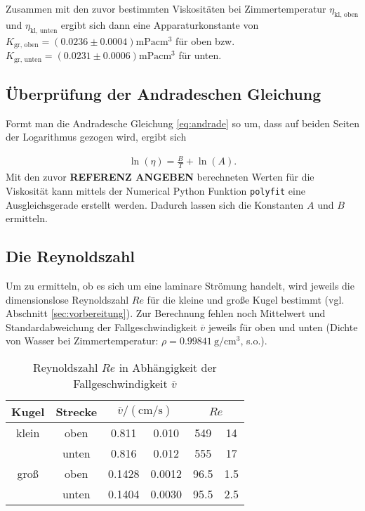 Zusammen mit den zuvor bestimmten Viskositäten bei Zimmertemperatur $\eta_{\text{kl, oben}}$ und $\eta_{\text{kl, unten}}$ ergibt sich dann eine Apparaturkonstante von
$K_{\text{gr, oben}} = \left(0.0236 \pm 0.0004 \right) \unit{\milli\Pa \cubic\cm}$ für oben bzw.
$K_{\text{gr, unten}} = \left(0.0231 \pm 0.0006 \right) \unit{\milli\Pa \cubic\cm}$ für unten.




\subsection[]{Überprüfung der Andradeschen Gleichung}
Formt man die Andradesche Gleichung \eqref{eq:andrade} so um, dass auf beiden Seiten der Logarithmus gezogen wird, ergibt sich

\begin{align}
    \ln {\left( \eta \right)} = \frac{B}{T} + \ln{\left( A \right)}.
\end{align}
Mit den zuvor \textbf{REFERENZ ANGEBEN} berechneten Werten für die Viskosität kann mittels der Numerical Python Funktion \texttt{polyfit}
eine Ausgleichsgerade erstellt werden. Dadurch lassen sich die Konstanten $A$ und $B$ ermitteln.


\subsection[]{Die Reynoldszahl}
Um zu ermitteln, ob es sich um eine laminare Strömung handelt, wird jeweils die dimensionslose Reynoldszahl $Re$ für die kleine und große Kugel bestimmt
(vgl. Abschnitt \ref{sec:vorbereitung}).
Zur Berechnung fehlen noch Mittelwert und Standardabweichung der Fallgeschwindigkeit $\overline{v}$ jeweils für oben und unten
(Dichte von Wasser bei Zimmertemperatur: $\rho = \qty{0.99841}{\g \per \cm^3}$, s.o.).

\begin{table}
    \caption[]{Reynoldszahl $Re$ in Abhängigkeit der Fallgeschwindigkeit $\overline{v}$}
    \label{tab:reynold}
    \centering
    \begin{tabular}[]{S S S[table-format=1.4] @{${}\pm{}$} S[table-format=1.4] S[table-format=4.1] @{${}\pm{}$} S[table-format=3.1]}
        \toprule
        {Kugel} & {Strecke} &  &  \\
        \bottomrule
        {klein} & {oben} & 0.811 & 0.010 & 549 & 14 \\
         & {unten} & 0.816 & 0.012 & 555 & 17 \\
        {groß} & {oben} & 0.1428 & 0.0012 & 96.5 & 1.5 \\
         & {unten} & 0.1404 & 0.0030 & 95.5 & 2.5 \\
    \end{tabular}
\end{table}

